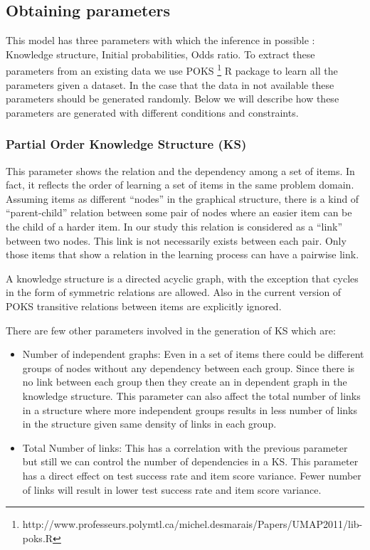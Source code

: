 \subsection{Obtaining parameters}
This model has three parameters with which the inference in possible : Knowledge structure, Initial probabilities, Odds ratio. To extract these parameters from an existing data we use POKS \footnote{http://www.professeurs.polymtl.ca/michel.desmarais/Papers/UMAP2011/lib-poks.R} R package to learn all the parameters given a dataset. In the case that the data in not available these parameters should be generated randomly. Below we will describe how these parameters are generated with different conditions and constraints.
\subsubsection{Partial Order Knowledge Structure (KS)}
This parameter shows the relation and the dependency among a set of items. In fact, it reflects the order of learning a set of items in the same problem domain. Assuming items as different ``nodes'' in the graphical structure, there is a kind of ``parent-child'' relation between some pair of nodes where an easier item can be the child of a harder item. In our study this relation is considered as a ``link'' between two nodes. This link is not necessarily exists between each pair. Only those items that show a relation in the learning process can have a pairwise link. 

A knowledge structure is a directed acyclic graph, with the exception that cycles in the form of symmetric relations are allowed. Also in the current version of POKS transitive relations between items are explicitly ignored. %



There are few other parameters involved in the generation of KS which are:
\begin{itemize}
\item Number of independent graphs: Even in a set of items there could be different groups of nodes without any dependency between each group. Since there is no link between each group then they create an in dependent graph in the knowledge structure. This parameter can also affect the total number of links in a structure where more independent groups results in less number of links in the structure given same density of links in each group. 
\item Total Number of links: This has a correlation with the previous parameter but still we can control the number of dependencies in a KS. This parameter has a direct effect on test success rate and item score variance. Fewer number of links will result in lower test success rate and item score variance.%
\end{itemize}


